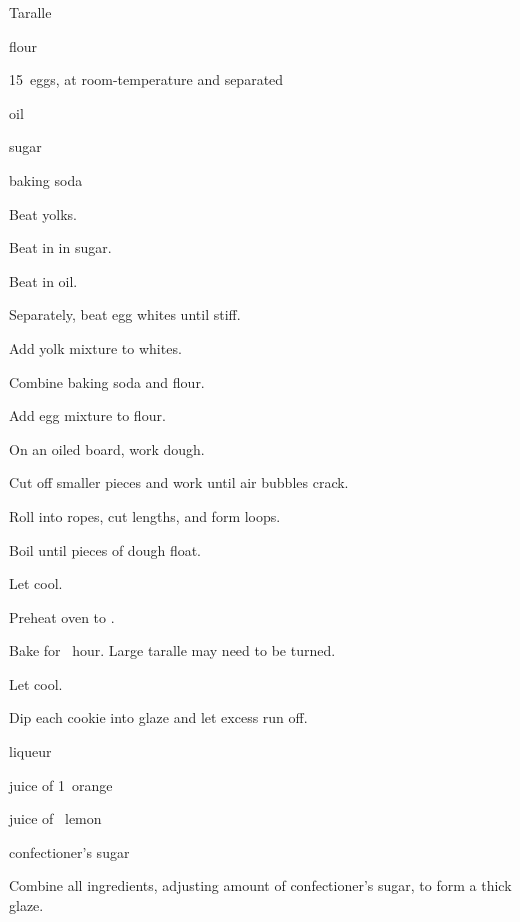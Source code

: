 \begin{recipe}{Taralle}{}{}

\begin{ingredients}
\item {} flour
\item 15~eggs, at room-temperature and separated
\item \C{\half} oil
\item {} sugar
\item \tp{\eighth} baking soda
\end{ingredients}

\begin{directions}
\item Beat yolks.
\item Beat in in sugar.
\item Beat in oil.
\item Separately, beat egg whites until stiff.
\item Add yolk mixture to whites.
\item Combine baking soda and flour.
\item Add egg mixture to flour.
\item On an oiled board, work dough.
\item Cut off smaller pieces and work until air bubbles crack.
\item Roll into ropes, cut lengths, and form loops.
\item Boil until pieces of dough float.
\item Let cool.
\item Preheat oven to .
\item Bake for \half~hour. Large taralle may need to be turned.
\item Let cool.
\item Dip each cookie into glaze and let excess run off.
\end{directions}

\begin{ingredients}
\item {} liqueur
\item juice of 1~orange
\item juice of \quarter~lemon
\item \lbs{1\half} confectioner's sugar
\end{ingredients}

\begin{directions}
\item Combine all ingredients, adjusting amount of confectioner's sugar, to form a thick glaze.
\end{directions}
\end{recipe}
